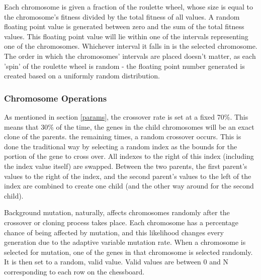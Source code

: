 \documentclass{sig-alternate}
\begin{document}
Each chromosome is given a fraction of the roulette wheel, whose size is equal to the chromosome's fitness divided by the total fitness of all values. A random floating point value is generated between zero and the sum of the total fitness values. This floating point value will lie within one of the intervals representing one of the chromosomes. Whichever interval it falls in is the selected chromosome. The order in which the chromosomes' intervals are placed doesn't matter, as each 'spin' of the roulette wheel is random - the floating point number generated is created based on a uniformly random distribution.

\subsubsection{Chromosome Operations}
As mentioned in section \ref{params}, the crossover rate is set at a fixed 70\%. This means that 30\% of the time, the genes in the child chromosomes will be an exact clone of the parents. the remaining times, a random crossover occurs. This is done the traditional way by selecting a random index as the bounds for the portion of the gene to cross over. All indexes to the right of this index (including the index value itself) are swapped. Between the two parents, the first parent's values to the right of the index, and the second parent's values to the left of the index are combined to create one child (and the other way around for the second child).

Background mutation, naturally, affects chromosomes randomly after the crossover or cloning process takes place. Each chromosome has a percentage chance of being affected by mutation, and this likelihood changes every generation due to the adaptive variable mutation rate. When a chromosome is selected for mutation, one of the genes in that chromosome is selected randomly. It is then set to a random, valid value. Valid values are between 0 and N corresponding to each row on the chessboard.

\newpage
\end{document}
